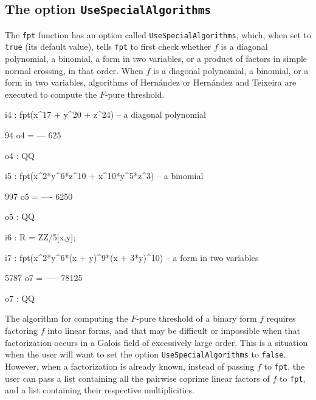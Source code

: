 \documentclass{amsart}
\begin{document}
\subsection{The option \texttt{UseSpecialAlgorithms}}\label{ss: UseSpecialAlgorithms}

The \texttt{fpt} function has an option called \texttt{UseSpecialAlgorithms}, which, when set to \texttt{true} (its default value), tells \texttt{fpt} to first check whether $f$ is a diagonal polynomial, a binomial, a form in two variables, or a product of factors in simple normal crossing, in that order.
When $f$ is a diagonal polynomial, a binomial, or a form in two variables, algorithms of Hern\'andez \cite{HernandezFInvariantsOfDiagonalHyp, HernandezFPureThresholdOfBinomial} or Hern\'andez and Teixeira \cite{HernandezTeixeiraFThresholdFunctions} are executed to compute the $F$-pure threshold.

\smallskip
{\small
{}
\begin{MyVerbatim}
i4 : fpt(x^17 + y^20 + z^24) -- a diagonal polynomial

      94
o4 = ---
     625

o4 : QQ

i5 : fpt(x^2*y^6*z^10 + x^10*y^5*z^3) -- a binomial

      997
o5 = ----
     6250

o5 : QQ

i6 : R = ZZ/5[x,y];

i7 : fpt(x^2*y^6*(x + y)^9*(x + 3*y)^10) -- a form in two variables

      5787
o7 = -----
     78125

o7 : QQ
\end{MyVerbatim}
}
\smallskip

\noindent The algorithm for computing the $F$-pure threshold of a binary form $f$ requires factoring $f$ into linear forms, and that may be difficult or impossible when that factorization occurs in a Galois field of excessively large order.
This is a situation when the user will want to set the option \texttt{UseSpecialAlgorithms} to \texttt{false}.
However, when a factorization is already known, instead of passing $f$ to \texttt{fpt}, the user can pass a list containing all the pairwise coprime linear factors of $f$ to \texttt{fpt}, and a list containing their respective multiplicities.
\end{document}
